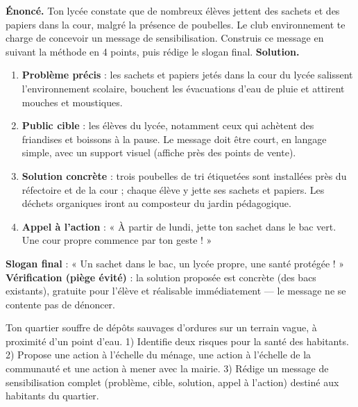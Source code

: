\documentclass[11pt]{article}
\begin{document}
\begin{exoresolu}
\textbf{Énoncé.} Ton lycée constate que de nombreux élèves jettent des sachets et des papiers dans la cour, malgré la présence de poubelles. Le club environnement te charge de concevoir un message de sensibilisation. Construis ce message en suivant la méthode en 4 points, puis rédige le slogan final.
\tcblower
\textbf{Solution.}
\begin{enumerate}
\item \textbf{Problème précis} : les sachets et papiers jetés dans la cour du lycée salissent l'environnement scolaire, bouchent les évacuations d'eau de pluie et attirent mouches et moustiques.
\item \textbf{Public cible} : les élèves du lycée, notamment ceux qui achètent des friandises et boissons à la pause. Le message doit être court, en langage simple, avec un support visuel (affiche près des points de vente).
\item \textbf{Solution concrète} : trois poubelles de tri étiquetées sont installées près du réfectoire et de la cour ; chaque élève y jette ses sachets et papiers. Les déchets organiques iront au composteur du jardin pédagogique.
\item \textbf{Appel à l'action} : « À partir de lundi, jette ton sachet dans le bac vert. Une cour propre commence par ton geste ! »
\end{enumerate}
\textbf{Slogan final} : « Un sachet dans le bac, un lycée propre, une santé protégée ! »
\textbf{Vérification (piège évité)} : la solution proposée est concrète (des bacs existants), gratuite pour l'élève et réalisable immédiatement — le message ne se contente pas de dénoncer.
\end{exoresolu}

\begin{exercice}
Ton quartier souffre de dépôts sauvages d'ordures sur un terrain vague, à proximité d'un point d'eau. 1) Identifie deux risques pour la santé des habitants. 2) Propose une action à l'échelle du ménage, une action à l'échelle de la communauté et une action à mener avec la mairie. 3) Rédige un message de sensibilisation complet (problème, cible, solution, appel à l'action) destiné aux habitants du quartier.
\end{exercice}
\end{document}
